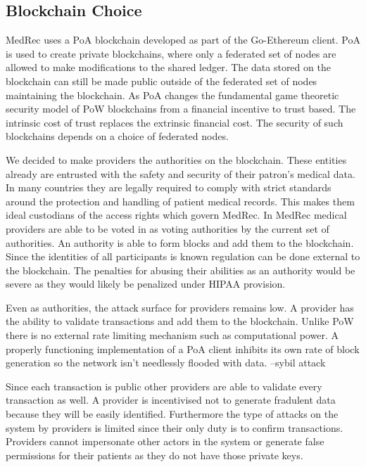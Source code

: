 \documentclass[a4paper]{article}
\begin{document}
\subsection{Blockchain Choice}

MedRec uses a PoA blockchain developed as part of the Go-Ethereum client. PoA is used to create private blockchains, where only a federated set of nodes are allowed to make modifications to the shared ledger. The data stored on the blockchain can still be made public outside of the federated set of nodes maintaining the blockchain. As PoA changes the fundamental game theoretic security model of PoW blockchains from a financial incentive to trust based. The intrinsic cost of trust replaces the extrinsic financial cost. The security of such blockchains depends on a choice of federated nodes.

We decided to make providers the authorities on the blockchain. These entities already are entrusted with the safety and security of their patron's medical data. In many countries they are legally required to comply with strict standards around the protection and handling of patient medical records. This makes them ideal custodians of the access rights which govern MedRec. In MedRec medical providers are able to be voted in as voting authorities by the current set of authorities. An authority is able to form blocks and add them to the blockchain. Since the identities of all participants is known regulation can be done external to the blockchain. The penalties for abusing their abilities as an authority would be severe as they would likely be penalized under HIPAA provision.

Even as authorities, the attack surface for providers remains low. A provider has the ability to validate transactions and add them to the blockchain. Unlike PoW there is no external rate limiting mechanism such as computational power. A properly functioning implementation of a PoA client inhibits its own rate of block generation so the network isn't needlessly flooded with data. --sybil attack

 Since each transaction is public other providers are able to validate every transaction as well. A provider is incentivised not to generate fradulent data because they will be easily identified.  Furthermore the type of attacks on the system by providers is limited since their only duty is to confirm transactions. Providers cannot impersonate other actors in the system or generate false permissions for their patients as they do not have those private keys.
\end{document}
